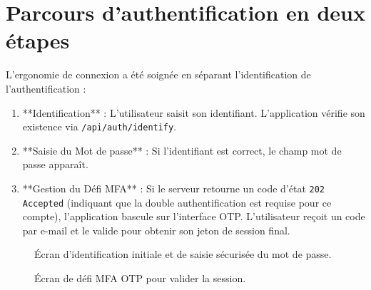 \documentclass[
]{IPLeiriaThesis}
\newcommand{\code}[1]{\texttt{\small #1}}
\begin{document}
\section{Parcours d'authentification en deux étapes}
L'ergonomie de connexion a été soignée en séparant l'identification de l'authentification :
\begin{enumerate}
  \item **Identification** : L'utilisateur saisit son identifiant. L'application vérifie son existence via \code{/api/auth/identify}.
  \item **Saisie du Mot de passe** : Si l'identifiant est correct, le champ mot de passe apparaît. 
  \item **Gestion du Défi MFA** : Si le serveur retourne un code d'état \code{202 Accepted} (indiquant que la double authentification est requise pour ce compte), l'application bascule sur l'interface OTP. L'utilisateur reçoit un code par e-mail et le valide pour obtenir son jeton de session final.
\end{enumerate}

\begin{figure}[h]
  \centering
  \caption{Écran d'identification initiale et de saisie sécurisée du mot de passe.}
  \label{fig:poc-login-steps}
\end{figure}

\begin{figure}[h]
  \centering
  \caption{Écran de défi MFA OTP pour valider la session.}
  \label{fig:poc-login-mfa}
\end{figure}
\end{document}

